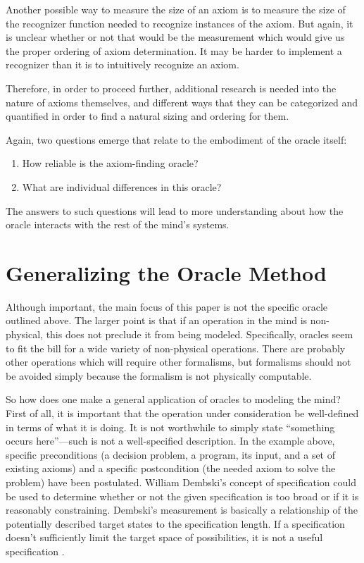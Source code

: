 Another possible way to measure the size of an axiom is to measure the size of the recognizer function needed to recognize instances of the axiom.  But again, it is unclear whether or not that would be the measurement which would give us the proper ordering of axiom determination.  It may be harder to implement a recognizer than it is to intuitively recognize an axiom. 

Therefore, in order to proceed further, additional research is needed into the nature of axioms themselves, and different ways that they can be categorized and quantified in order to find a natural sizing and ordering for them.


Again, two questions emerge that relate to the embodiment of the oracle itself:

\begin{enumerate}
\item How reliable is the axiom-finding oracle?
\item What are individual differences in this oracle?
\end{enumerate}

The answers to such questions will lead to more understanding about how the oracle interacts with the rest of the mind's systems.

\section{Generalizing the Oracle Method}

Although important, the main focus of this paper is not the specific oracle outlined above.  The larger point is that if an operation in the mind is non-physical, this does not preclude it from being modeled.  Specifically, oracles seem to fit the bill for a wide variety of non-physical operations.  There are probably other operations which will require other formalisms, but formalisms should not be avoided simply because the formalism is not physically computable.  

So how does one make a general application of oracles to modeling the mind?  First of all, it is important that the operation under consideration be well-defined in terms of what it is doing.  It is not worthwhile to simply state ``something occurs here''---such is not a well-specified description.  In the example above, specific preconditions (a decision problem, a program, its input, and a set of existing axioms) and a specific postcondition (the needed axiom to solve the problem) have been postulated.  William Dembski's concept of specification could be used to determine whether or not the given specification is too broad or if it is reasonably constraining.  Dembski's measurement is basically a relationship of the potentially described target states to the specification length.  If a specification doesn't sufficiently limit the target space of possibilities, it is not a useful specification \citep{dembski2005}.  

